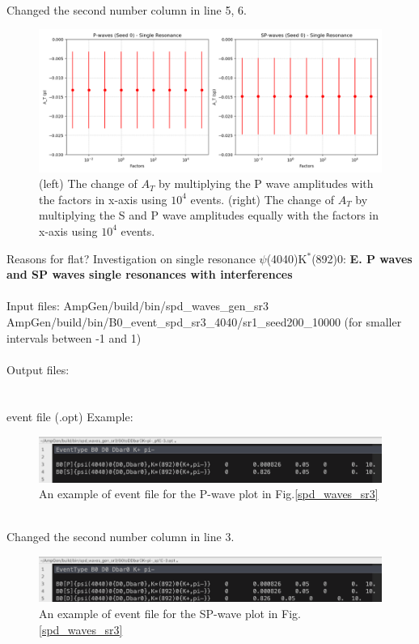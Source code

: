 \\
Changed the second number column in line 5, 6.
\begin{figure}[h]
\center
\includegraphics*[width=0.96\linewidth]{p_wave/spd_waves_sr1}
\caption{(left) The change of $A_T$ by multiplying the P wave amplitudes with the factors in x-axis using $10^4$ events. (right) The change of $A_T$ by multiplying the S and P wave amplitudes equally with the factors in x-axis using $10^4$ events.}
\label{spd_waves_sr1}
\end{figure}
Reasons for flat?
\clearpage
\noindent Investigation on single resonance $\psi$(4040)K$^*$(892)0:
\noindent \textbf{E. P waves and SP waves single resonances with interferences}
\\
\\
\indent Input files: AmpGen/build/bin/spd\_waves\_gen\_sr3 
\\
\indent \indent \indent \indent AmpGen/build/bin/B0\_event\_spd\_sr3\_4040/sr1\_seed200\_10000 (for smaller intervals between -1 and 1)
\\
\\
\indent Output files: 
\\
\indent \indent \indent {}
\\
\\
event file (.opt) Example:
\begin{figure}[h]
\center
\includegraphics*[width=0.96\linewidth]{p_wave/event_info_p_sr3_10000}
\caption{An example of event file for the P-wave plot in Fig.\ref{spd_waves_sr3}}
\label{event_info_p_sr3_10000}
\end{figure}
\\
Changed the second number column in line 3.
\begin{figure}[h]
\center
\includegraphics*[width=0.96\linewidth]{p_wave/event_info_sp_sr3_10000}
\caption{An example of event file for the SP-wave plot in Fig.\ref{spd_waves_sr3}}
\label{event_info_sp_sr3_10000}
\end{figure}
